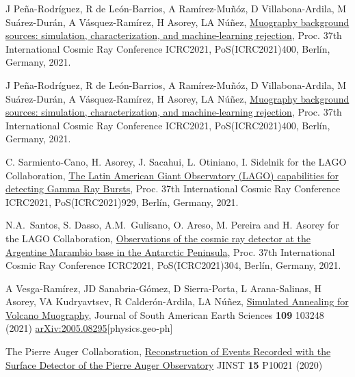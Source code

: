 \begin{etaremune}
\item {} J Peña-Rodríguez, R de León-Barrios, A Ramírez-Muñóz, D Villabona-Ardila, M Suárez-Durán, A Vásquez-Ramírez, H Asorey, LA Núñez, \href{https://doi.org/10.22323/1.395.0400}{Muography background sources: simulation, characterization, and machine-learning rejection}, \en Proc.
37th International Cosmic Ray Conference ICRC2021, PoS(ICRC2021)400, Berlín, Germany, 2021.

\item {} J Peña-Rodríguez, R de León-Barrios, A Ramírez-Muñóz, D Villabona-Ardila, M Suárez-Durán, A Vásquez-Ramírez, H Asorey, LA Núñez, \href{https://doi.org/10.22323/1.395.0400}{Muography background sources: simulation, characterization, and machine-learning rejection}, \en Proc.
37th International Cosmic Ray Conference ICRC2021, PoS(ICRC2021)400, Berlín, Germany, 2021.

\item {} C. Sarmiento-Cano, H. Asorey, J. Sacahui, L. Otiniano, I. Sidelnik for the LAGO Collaboration, \href{https://doi.org/10.22323/1.395.0929}{The Latin American Giant Observatory (LAGO) capabilities for detecting Gamma Ray Bursts}, \en Proc.
37th International Cosmic Ray Conference ICRC2021, PoS(ICRC2021)929, Berlín, Germany, 2021.

\item {} N.A.\ Santos, S. Dasso, A.M.\ Gulisano, O. Areso, M. Pereira and H. Asorey for the LAGO Collaboration, \href{https://doi.org/10.22323/1.395.304}{Observations of the cosmic ray detector at the Argentine Marambio base in the Antarctic Peninsula}, \en Proc.
37th International Cosmic Ray Conference ICRC2021, PoS(ICRC2021)304, Berlín, Germany, 2021.

\item {} A Vesga-Ramírez, JD Sanabria-Gómez, D Sierra-Porta, L Arana-Salinas, H Asorey, VA Kudryavtsev, R Calderón-Ardila, LA Núñez, \href{https://doi.org/10.1016/j.jsames.2021.103248}{{Simulated Annealing for Volcano Muography}}, Journal of South American Earth Sciences {\textbf{109}} 103248 (2021) \href{https://arxiv.org/abs/2005.08295}{arXiv:2005.08295}[physics.geo-ph]

\item {}The Pierre Auger Collaboration, \href{https://doi.org/10.1088/1748-0221/15/10/P10021}{Reconstruction of Events Recorded with the Surface Detector of the Pierre Auger Observatory} JINST {\textbf{15}} P10021 (2020) %


\end{etaremune}
